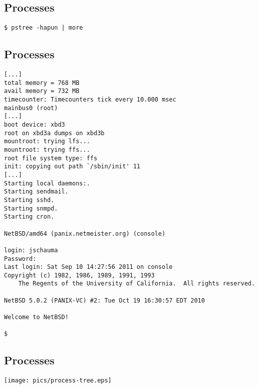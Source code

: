 \documentclass[sxga]{xdvislides}
\begin{document}
\subsection{Processes}
\vspace*{\fill}
\Huge
\begin{center}
	{\tt \$ pstree -hapun | more}
\end{center}
\Normalsize
\vspace*{\fill}



\subsection{Processes}
\small
\begin{verbatim}
[...]
total memory = 768 MB
avail memory = 732 MB
timecounter: Timecounters tick every 10.000 msec
mainbus0 (root)
[...]
boot device: xbd3
root on xbd3a dumps on xbd3b
mountroot: trying lfs...
mountroot: trying ffs...
root file system type: ffs
init: copying out path `/sbin/init' 11
[...]
Starting local daemons:.
Starting sendmail.
Starting sshd.
Starting snmpd.
Starting cron.

NetBSD/amd64 (panix.netmeister.org) (console)

login: jschauma
Password:
Last login: Sat Sep 10 14:27:56 2011 on console
Copyright (c) 1982, 1986, 1989, 1991, 1993
    The Regents of the University of California.  All rights reserved.

NetBSD 5.0.2 (PANIX-VC) #2: Tue Oct 19 16:30:57 EDT 2010

Welcome to NetBSD!

$
\end{verbatim}
\Normalsize



\subsection{Processes}
\begin{center}
\texttt{[image: pics/process-tree.eps]} \\
\end{center}
\end{document}
